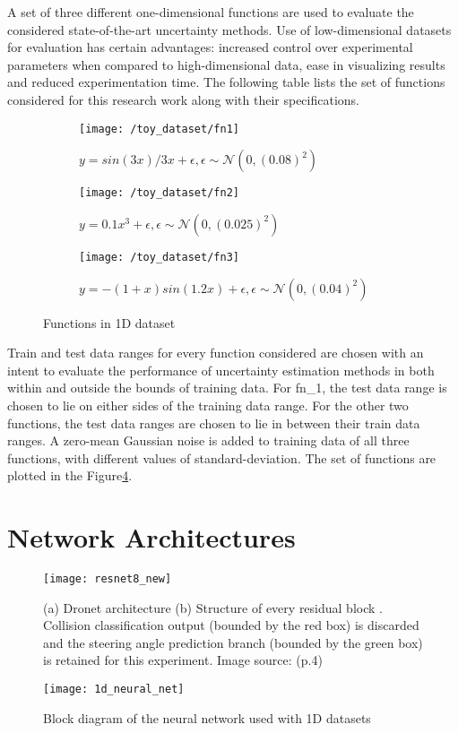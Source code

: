 A set of three different one-dimensional functions are used to evaluate the considered state-of-the-art uncertainty methods. Use of low-dimensional datasets for evaluation has certain advantages: increased control over experimental parameters when compared to high-dimensional data, ease in visualizing results and reduced experimentation time. The following table lists the set of functions considered for this research work along with their specifications.
\begin{figure}[H]
	\centering
	\begin{subfigure}[b]{0.45\textwidth}
		\centering
		\texttt{[image: /toy\_dataset/fn1]}
		\caption{$y=sin(3x)/3x+\epsilon, \epsilon \sim \mathcal{N}(0,(0.08)^2)$}
		\label{fig:y equals x}
	\end{subfigure}
	\hfill
	\begin{subfigure}[b]{0.45\textwidth}
		\centering
		\texttt{[image: /toy\_dataset/fn2]}
		\caption{$y=0.1x^3+\epsilon, \epsilon \sim \mathcal{N}(0,(0.025)^2)$}
		\label{fig:three sin x}
	\end{subfigure}
	\hfill
	\begin{subfigure}[b]{0.45\textwidth}
		\centering
		\texttt{[image: /toy\_dataset/fn3]}
		\caption{$y=-(1+x)sin(1.2x)+\epsilon, \epsilon \sim \mathcal{N}(0,(0.04)^2)$}
		\label{fig:five over x}
	\end{subfigure}
	\caption{Functions in 1D dataset}
	\label{fig_1d_dataset}
\end{figure}
Train and test data ranges for every function considered are chosen with an intent to evaluate the performance of uncertainty estimation methods in both within and outside the bounds of training data. For fn\_1, the test data range is chosen to lie on either sides of the training data range. For the other two functions, the test data ranges are chosen to lie in between their train data ranges. A zero-mean Gaussian noise is added to training data of all three functions, with different values of standard-deviation. The set of functions are plotted in the Figure\ref{fig_1d_dataset}. 
\section{Network Architectures}
\begin{figure}[H]
	\texttt{[image: resnet8\_new]}
	\caption[Dronet architecture]{(a) Dronet architecture (b) Structure of every residual block . Collision classification output (bounded by the red box) is discarded and the steering angle prediction branch (bounded by the green box) is retained for this experiment.  Image source: \cite{loquercio2018dronet} (p.4)}
	\label{fig_resnet8}
\end{figure}
\begin{figure}[H]
	\centering
	\texttt{[image: 1d\_neural\_net]}
	\caption{Block diagram of the neural network used with 1D datasets}
	\label{fig_1dnet}
\end{figure}
